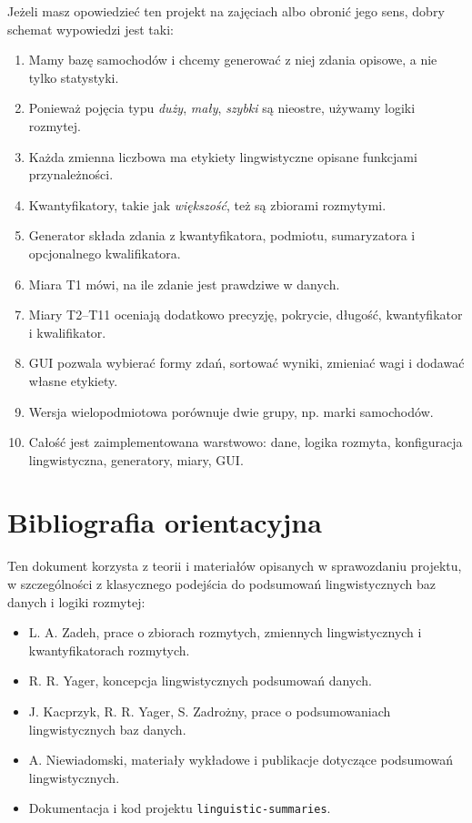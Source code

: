 \documentclass[11pt,a4paper]{article}
\newcommand{\code}[1]{\texttt{#1}}
\begin{document}
Jeżeli masz opowiedzieć ten projekt na zajęciach albo obronić jego sens, dobry schemat wypowiedzi jest taki:

\begin{enumerate}
    \item Mamy bazę samochodów i chcemy generować z niej zdania opisowe, a nie tylko statystyki.
    \item Ponieważ pojęcia typu \emph{duży}, \emph{mały}, \emph{szybki} są nieostre, używamy logiki rozmytej.
    \item Każda zmienna liczbowa ma etykiety lingwistyczne opisane funkcjami przynależności.
    \item Kwantyfikatory, takie jak \emph{większość}, też są zbiorami rozmytymi.
    \item Generator składa zdania z kwantyfikatora, podmiotu, sumaryzatora i opcjonalnego kwalifikatora.
    \item Miara T1 mówi, na ile zdanie jest prawdziwe w danych.
    \item Miary T2--T11 oceniają dodatkowo precyzję, pokrycie, długość, kwantyfikator i kwalifikator.
    \item GUI pozwala wybierać formy zdań, sortować wyniki, zmieniać wagi i dodawać własne etykiety.
    \item Wersja wielopodmiotowa porównuje dwie grupy, np. marki samochodów.
    \item Całość jest zaimplementowana warstwowo: dane, logika rozmyta, konfiguracja lingwistyczna, generatory, miary, GUI.
\end{enumerate}

\section{Bibliografia orientacyjna}

Ten dokument korzysta z teorii i materiałów opisanych w sprawozdaniu projektu, w szczególności z klasycznego podejścia do podsumowań lingwistycznych baz danych i logiki rozmytej:

\begin{itemize}
    \item L. A. Zadeh, prace o zbiorach rozmytych, zmiennych lingwistycznych i kwantyfikatorach rozmytych.
    \item R. R. Yager, koncepcja lingwistycznych podsumowań danych.
    \item J. Kacprzyk, R. R. Yager, S. Zadrożny, prace o podsumowaniach lingwistycznych baz danych.
    \item A. Niewiadomski, materiały wykładowe i publikacje dotyczące podsumowań lingwistycznych.
    \item Dokumentacja i kod projektu \code{linguistic-summaries}.
\end{itemize}
\end{document}
